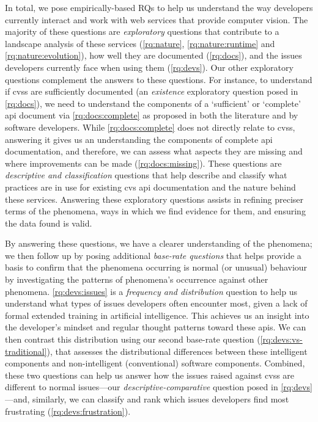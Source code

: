 In total, we pose \NumEmpiricalRQs{} empirically-based RQs to help us understand the way developers currently interact and work with web services that provide computer vision. The majority of these questions are \textit{exploratory} questions that contribute to a landscape analysis of these services (\ref{rq:nature}, \ref{rq:nature:runtime} and \ref{rq:nature:evolution}), how well they are documented (\ref{rq:docs}), and the issues developers currently face when using them (\ref{rq:devs}). Our other exploratory questions complement the answers to these questions. For instance, to understand if \glspl{cvs} are sufficiently documented (an \textit{existence} exploratory question posed in \ref{rq:docs}), we need to understand the components of a `sufficient' or `complete' \gls{api} document via \ref{rq:docs:complete} as proposed in both the literature and by software developers. While \ref{rq:docs:complete} does not directly relate to \glspl{cvs}, answering it gives us an understanding the components of complete \gls{api} documentation, and therefore, we can assess what aspects they are missing and where improvements can be made (\ref{rq:docs:missing}). These questions are \textit{descriptive and classification} questions that help describe and classify what practices are in use for existing \gls{cvs} \gls{api} documentation and the nature behind these services. Answering these exploratory questions assists in refining preciser terms of the phenomena, ways in which we find evidence for them, and ensuring the data found is valid.

By answering these questions, we have a clearer understanding of the phenomena; we then follow up by posing \NumBaseRateRQs{} additional \textit{base-rate questions} that helps provide a basis to confirm that the phenomena occurring is normal (or unusual) behaviour by investigating the patterns of phenomena's occurrence against other phenomena. \ref{rq:devs:issues} is a \textit{frequency and distribution} question to help us understand what types of issues developers often encounter most, given a lack of formal extended training in artificial intelligence. This achieves us an insight into the developer's mindset and regular thought patterns toward these \glspl{api}. We can then contrast this distribution using our second base-rate question (\ref{rq:devs:vs-traditional}), that assesses the distributional differences between these intelligent components and non-intelligent (conventional) software components. Combined, these two questions can help us answer how the issues raised against \glspl{cvs} are different to normal  issues---our \textit{descriptive-comparative} question posed in \ref{rq:devs}---and, similarly, we can classify and rank which issues developers find most frustrating (\ref{rq:devs:frustration}).

